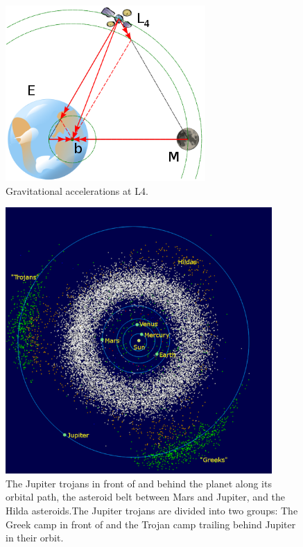 \documentclass[12pt,a4paper]{article}
\begin{document}
\begin{figure}[H]
\centering
\includegraphics[width=3in]{403px-L4_diagram.png}
\caption{Gravitational accelerations at L4.}
\end{figure}


\begin{figure}[H]
\centering
\includegraphics[width=4in]{600px-InnerSolarSystem-en.png}
\caption{The Jupiter trojans in front of and behind the planet along its orbital path, the asteroid belt between Mars and Jupiter, and the Hilda asteroids.The Jupiter trojans are divided into two groups: The Greek camp in front of and the Trojan camp trailing behind Jupiter in their orbit.}
\end{figure}
\end{document}
